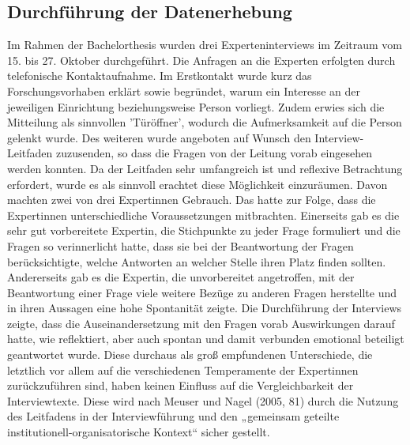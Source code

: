 \subsection{Durchführung der Datenerhebung}
Im Rahmen der Bachelorthesis wurden drei Experteninterviews im Zeitraum vom 15. bis 27. Oktober durchgeführt. 
Die Anfragen an die Experten erfolgten durch telefonische Kontaktaufnahme. Im Erstkontakt wurde kurz das Forschungsvorhaben erklärt sowie begründet, warum ein Interesse an der jeweiligen Einrichtung beziehungsweise Person vorliegt. Zudem erwies sich die Mitteilung als sinnvollen ’Türöffner’, wodurch die Aufmerksamkeit auf die Person gelenkt wurde. 
Des weiteren wurde angeboten auf Wunsch den Interview-Leitfaden zuzusenden, so dass die Fragen von der Leitung vorab eingesehen werden konnten. Da der Leitfaden sehr umfangreich ist und reflexive Betrachtung erfordert, wurde es als sinnvoll erachtet diese Möglichkeit einzuräumen. Davon machten zwei von drei Expertinnen Gebrauch. Das hatte zur Folge, dass die Expertinnen unterschiedliche Voraussetzungen mitbrachten. Einerseits gab es die sehr gut vorbereitete Expertin, die Stichpunkte zu jeder Frage formuliert und die Fragen so verinnerlicht hatte, dass sie bei der Beantwortung der Fragen berücksichtigte, welche Antworten an welcher Stelle ihren Platz finden sollten. Andererseits gab es die Expertin, die unvorbereitet angetroffen, mit der Beantwortung einer Frage viele weitere Bezüge zu anderen Fragen herstellte und in ihren Aussagen eine hohe Spontanität zeigte. Die Durchführung der Interviews zeigte, dass die Auseinandersetzung mit den Fragen vorab Auswirkungen darauf hatte, wie reflektiert, aber auch spontan und damit verbunden emotional beteiligt geantwortet wurde.     
Diese durchaus als groß empfundenen Unterschiede, die letztlich vor allem auf die verschiedenen Temperamente der Expertinnen zurückzuführen sind, haben keinen Einfluss auf die Vergleichbarkeit der Interviewtexte. Diese wird nach Meuser und Nagel (2005, 81) durch die Nutzung des Leitfadens in der Interviewführung und den „gemeinsam geteilte institutionell-organisatorische Kontext“ sicher gestellt.


